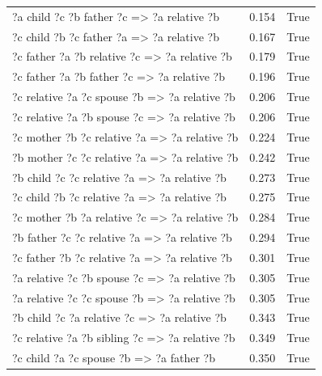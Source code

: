 \begin{longtable}{lrl}
     ?a  child  ?c  ?b  father  ?c   => ?a  relative  ?b &           0.154 &                     True \\
     ?c  child  ?b  ?c  father  ?a   => ?a  relative  ?b &           0.167 &                     True \\
  ?c  father  ?a  ?b  relative  ?c   => ?a  relative  ?b &           0.179 &                     True \\
    ?c  father  ?a  ?b  father  ?c   => ?a  relative  ?b &           0.196 &                     True \\
  ?c  relative  ?a  ?c  spouse  ?b   => ?a  relative  ?b &           0.206 &                     True \\
  ?c  relative  ?a  ?b  spouse  ?c   => ?a  relative  ?b &           0.206 &                     True \\
  ?c  mother  ?b  ?c  relative  ?a   => ?a  relative  ?b &           0.224 &                     True \\
  ?b  mother  ?c  ?c  relative  ?a   => ?a  relative  ?b &           0.242 &                     True \\
   ?b  child  ?c  ?c  relative  ?a   => ?a  relative  ?b &           0.273 &                     True \\
   ?c  child  ?b  ?c  relative  ?a   => ?a  relative  ?b &           0.275 &                     True \\
  ?c  mother  ?b  ?a  relative  ?c   => ?a  relative  ?b &           0.284 &                     True \\
  ?b  father  ?c  ?c  relative  ?a   => ?a  relative  ?b &           0.294 &                     True \\
  ?c  father  ?b  ?c  relative  ?a   => ?a  relative  ?b &           0.301 &                     True \\
  ?a  relative  ?c  ?b  spouse  ?c   => ?a  relative  ?b &           0.305 &                     True \\
  ?a  relative  ?c  ?c  spouse  ?b   => ?a  relative  ?b &           0.305 &                     True \\
   ?b  child  ?c  ?a  relative  ?c   => ?a  relative  ?b &           0.343 &                     True \\
 ?c  relative  ?a  ?b  sibling  ?c   => ?a  relative  ?b &           0.349 &                     True \\
       ?c  child  ?a  ?c  spouse  ?b   => ?a  father  ?b &           0.350 &                     True \\

\end{longtable}
